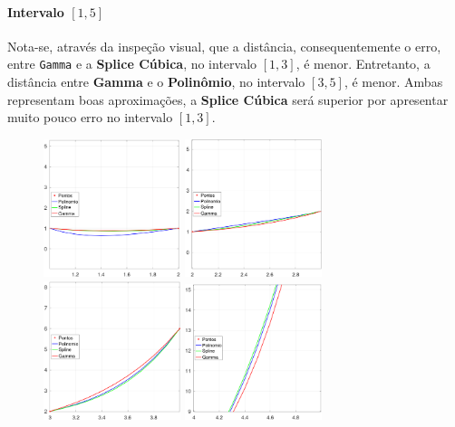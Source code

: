 \documentclass{article}
\begin{document}
            \paragraph{Intervalo $[1,5]$}Nota-se, através da inspeção visual, que a distância, consequentemente o erro, entre \texttt{Gamma} e a \textbf{Splice Cúbica}, no intervalo $[1,3]$, é menor. Entretanto, a distância entre \textbf{Gamma} e o \textbf{Polinômio}, no intervalo $[3,5]$, é menor. Ambas representam boas aproximações, a \textbf{Splice Cúbica} será superior por apresentar muito pouco erro no intervalo $[1,3]$.
                \begin{figure}[h]
                    \includegraphics[width = 4cm]{zoom1.png}
                    \includegraphics[width = 4cm]{zoom2.png}
                    \includegraphics[width = 4cm]{zoom3.png}
                    \includegraphics[width = 4cm]{zoom4.png}
                    \centering
                \end{figure}
\end{document}
